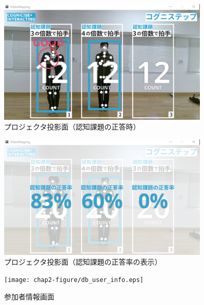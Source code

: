 \begin{figure}[tbp]
	\centering
			\includegraphics[width=0.9\textwidth]{chap2-figure/vm_clap.eps}
	\caption{プロジェクタ投影面（認知課題の正答時）}
	\label{fig:vm_clap}
\end{figure}

\begin{figure}[tbp]
	\centering
			\includegraphics[width=0.9\textwidth]{chap2-figure/vm_answer_rate.eps}
	\caption{プロジェクタ投影面（認知課題の正答率の表示）}
	\label{fig:vm_answer_rate}
\end{figure}

\begin{figure}[tbp]
	\centering
			\texttt{[image: chap2-figure/db\_user\_info.eps]}
	\caption{参加者情報画面}
	\label{fig:db_user_info}
\end{figure}

